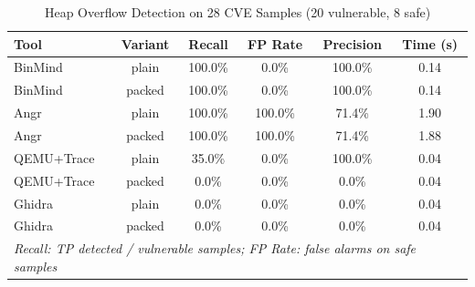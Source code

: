 \begin{table}[t]
\centering
\caption{Heap Overflow Detection on 28 CVE Samples (20 vulnerable, 8 safe)}
\label{tab:heap-benchmark}
\begin{tabular}{lccccc}
\toprule
Tool & Variant & Recall & FP Rate & Precision & Time (s) \\
\midrule
BinMind & plain & 100.0\% & 0.0\% & 100.0\% & 0.14 \\
BinMind & packed & 100.0\% & 0.0\% & 100.0\% & 0.14 \\
Angr & plain & 100.0\% & 100.0\% & 71.4\% & 1.90 \\
Angr & packed & 100.0\% & 100.0\% & 71.4\% & 1.88 \\
QEMU+Trace & plain & 35.0\% & 0.0\% & 100.0\% & 0.04 \\
QEMU+Trace & packed & 0.0\% & 0.0\% & 0.0\% & 0.04 \\
Ghidra & plain & 0.0\% & 0.0\% & 0.0\% & 0.04 \\
Ghidra & packed & 0.0\% & 0.0\% & 0.0\% & 0.04 \\
\midrule
\multicolumn{6}{l}{\emph{Recall: TP detected / vulnerable samples; FP Rate: false alarms on safe samples}} \\
\bottomrule
\end{tabular}
\end{table}